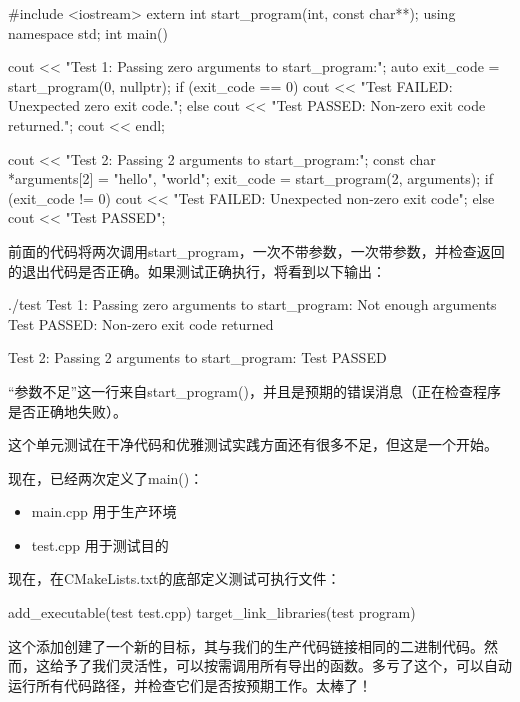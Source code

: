 
\begin{cpp}
#include <iostream>
extern int start_program(int, const char**);
using namespace std;
int main()
{
    cout << "Test 1: Passing zero arguments to start_program:\n";
    auto exit_code = start_program(0, nullptr);
    if (exit_code == 0)
        cout << "Test FAILED: Unexpected zero exit code.\n";
    else
        cout << "Test PASSED: Non-zero exit code returned.\n";
    cout << endl;

    cout << "Test 2: Passing 2 arguments to start_program:\n";
    const char *arguments[2] = {"hello", "world"};
    exit_code = start_program(2, arguments);
    if (exit_code != 0)
        cout << "Test FAILED: Unexpected non-zero exit code\n";
    else
        cout << "Test PASSED\n";
}
\end{cpp}

前面的代码将两次调用start\_program，一次不带参数，一次带参数，并检查返回的退出代码是否正确。如果测试正确执行，将看到以下输出：

\begin{shell}
./test
Test 1: Passing zero arguments to start_program:
Not enough arguments
Test PASSED: Non-zero exit code returned

Test 2: Passing 2 arguments to start_program:
Test PASSED
\end{shell}

“参数不足”这一行来自start\_program()，并且是预期的错误消息（正在检查程序是否正确地失败）。

这个单元测试在干净代码和优雅测试实践方面还有很多不足，但这是一个开始。

现在，已经两次定义了main()：

\begin{itemize}
\item
main.cpp 用于生产环境

\item
test.cpp 用于测试目的
\end{itemize}

现在，在CMakeLists.txt的底部定义测试可执行文件：

\begin{cmake}
add_executable(test test.cpp)
target_link_libraries(test program)
\end{cmake}

这个添加创建了一个新的目标，其与我们的生产代码链接相同的二进制代码。然而，这给予了我们灵活性，可以按需调用所有导出的函数。多亏了这个，可以自动运行所有代码路径，并检查它们是否按预期工作。太棒了！
















